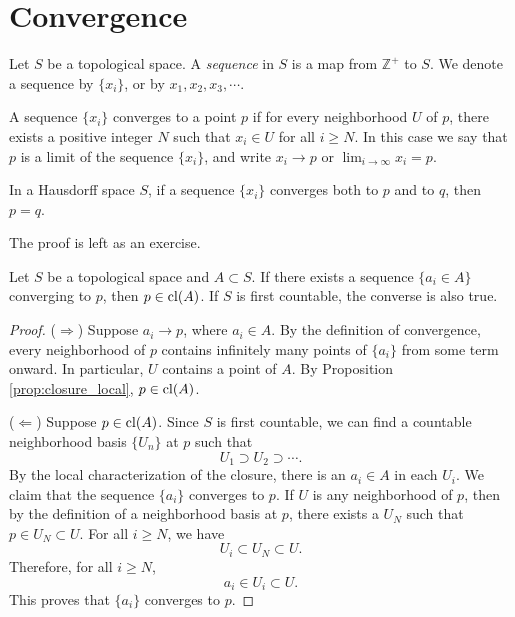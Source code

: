 \section{Convergence}

Let $S$ be a topological space. A \emph{sequence} in $S$ is a map from
$\mathbb{Z}^+$ to $S$. We denote a sequence by $\{x_i\}$, or by
$x_1,x_2,x_3,\cdots$.

\begin{definition}
	A sequence $\{x_i\}$ converges to a point $p$ if for every neighborhood
	$U$ of $p$, there exists a positive integer $N$ such that $x_i\in U$ for
	all $i\ge N$. In this case we say that $p$ is a limit of the sequence
	$\{x_i\}$, and write $x_i\to p$ or $\lim_{i\to \infty }x_i = p$.
\end{definition}

\begin{proposition}
	In a Hausdorff space $S$, if a sequence $\{x_i\}$ converges both to $p$
	and to $q$, then $p=q$.
\end{proposition}

The proof is left as an exercise.


\begin{proposition} Let $S$ be a topological space and
	$A\subset S$. If there exists a sequence $\{a_i\in A\}$ converging to
	$p$, then $p\in\operatorname{cl}(A)$. If $S$ is first countable, the converse is also
	true.

\end{proposition}

\begin{proof}

	($\Longrightarrow$) Suppose $a_i\to p$, where $a_i\in A$. By the
	definition of convergence, every neighborhood of $p$ contains infinitely
	many points of $\{a_i\}$ from some term onward. In particular, $U$
	contains a point of $A$. By Proposition \ref{prop:closure_local},
	$p\in\operatorname{cl}(A)$.

	($\Longleftarrow$) Suppose $p\in\operatorname{cl}(A)$. Since $S$ is first countable,
	we can find a countable neighborhood basis $\{U_n\}$ at $p$ such that
	\begin{displaymath}
		U_1 \supset U_2 \supset \cdots.
	\end{displaymath}
	By the local characterization of the closure, there is an $a_i\in A$ in
	each $U_i$. We claim that the sequence $\{a_i\}$ converges to $p$. If
	$U$ is any neighborhood of $p$, then by the definition of a neighborhood
	basis at $p$, there exists a $U_N$ such that $p\in U_N\subset U$. For
	all $i\ge N$, we have
	\begin{displaymath}
		U_i\subset U_N\subset U.
	\end{displaymath}
	Therefore, for all $i\ge N$,
	\begin{displaymath}
		a_i\in U_i\subset U.
	\end{displaymath}
	This proves that $\{a_i\}$ converges to $p$.


\end{proof}



